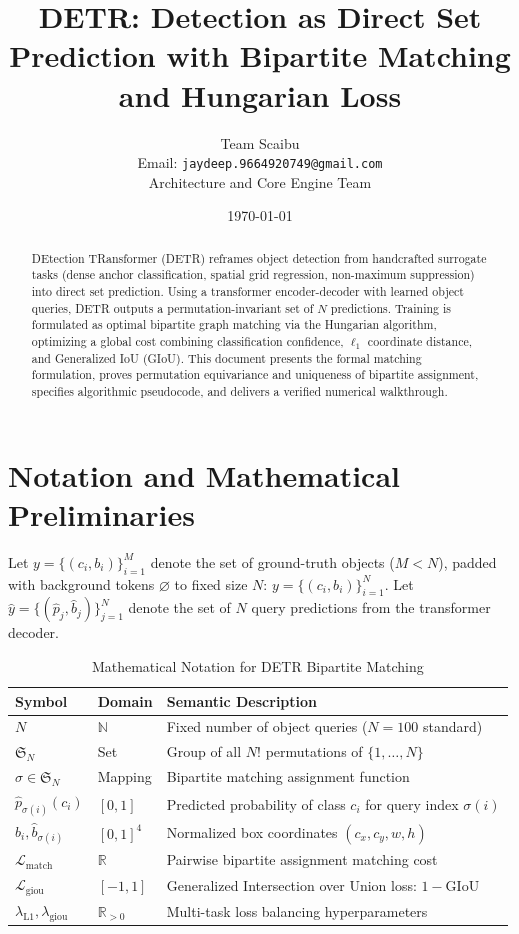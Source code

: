 \documentclass[11pt,a4paper]{article}
\title{DETR: Detection as Direct Set Prediction with Bipartite Matching and Hungarian Loss}
\author{Team Scaibu \\ \small Email: \texttt{jaydeep.9664920749@gmail.com} \\ \small Architecture and Core Engine Team}
\date{\today}
\theoremstyle{definition}
\begin{document}
\maketitle

\begin{abstract}
DEtection TRansformer (DETR) reframes object detection from handcrafted surrogate tasks (dense anchor classification, spatial grid regression, non-maximum suppression) into direct set prediction. Using a transformer encoder-decoder with learned object queries, DETR outputs a permutation-invariant set of $N$ predictions. Training is formulated as optimal bipartite graph matching via the Hungarian algorithm, optimizing a global cost combining classification confidence, $\ell_1$ coordinate distance, and Generalized IoU (GIoU). This document presents the formal matching formulation, proves permutation equivariance and uniqueness of bipartite assignment, specifies algorithmic pseudocode, and delivers a verified numerical walkthrough.
\end{abstract}

\section{Notation and Mathematical Preliminaries}

Let $y = \{(c_i, b_i)\}_{i=1}^M$ denote the set of ground-truth objects ($M < N$), padded with background tokens $\varnothing$ to fixed size $N$: $y = \{(c_i, b_i)\}_{i=1}^N$. Let $\hat{y} = \{(\hat{p}_j, \hat{b}_j)\}_{j=1}^N$ denote the set of $N$ query predictions from the transformer decoder.

\begin{table}[h]
\centering
\caption{Mathematical Notation for DETR Bipartite Matching}
\begin{tabular}{lll}
\toprule
\textbf{Symbol} & \textbf{Domain} & \textbf{Semantic Description} \\
\midrule
$N$ & $\mathbb{N}$ & Fixed number of object queries ($N = 100$ standard) \\
$\mathfrak{S}_N$ & Set & Group of all $N!$ permutations of $\{1, \dots, N\}$ \\
$\sigma \in \mathfrak{S}_N$ & Mapping & Bipartite matching assignment function \\
$\hat{p}_{\sigma(i)}(c_i)$ & $[0, 1]$ & Predicted probability of class $c_i$ for query index $\sigma(i)$ \\
$b_i, \hat{b}_{\sigma(i)}$ & $[0, 1]^4$ & Normalized box coordinates $(c_x, c_y, w, h)$ \\
$\mathcal{L}_{\text{match}}$ & $\mathbb{R}$ & Pairwise bipartite assignment matching cost \\
$\mathcal{L}_{\text{giou}}$ & $[-1, 1]$ & Generalized Intersection over Union loss: $1 - \text{GIoU}$ \\
$\lambda_{\text{L1}}, \lambda_{\text{giou}}$ & $\mathbb{R}_{> 0}$ & Multi-task loss balancing hyperparameters \\
\bottomrule
\end{tabular}
\end{table}
\end{document}

